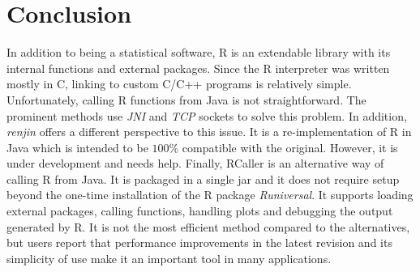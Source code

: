 \documentclass[10pt,a4paper]{article}
\begin{document}
\section{Conclusion}
In addition to being a statistical software, R is an extendable library with its internal functions and external packages. 
Since the R interpreter was written mostly in C, linking to custom C/C++ programs is relatively simple. Unfortunately,
calling R functions from Java is not straightforward. The prominent methods use \emph{JNI} and \emph{TCP} sockets to solve this problem.
In addition, \emph{renjin} offers a different perspective to this issue. It is a re-implementation of R in Java which
is intended to be $100$\% compatible with the original. However, it is under development and needs help. Finally, RCaller is an alternative
way of calling R from Java. It is packaged in a single jar and it does not require setup beyond the one-time installation of the R 
package \emph{Runiversal}. It 
supports loading external packages, calling functions, handling plots and debugging the output generated by R. It is not the most
efficient method compared to the alternatives, but users report that performance improvements in the latest revision and its simplicity of use make it an important tool in many applications.


%
\end{document}
